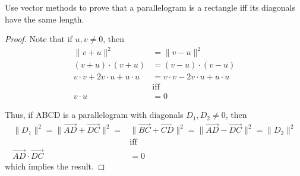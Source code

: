 \begin{exercise} \label{e1.2.10}
    Use vector methods to prove that a parallelogram is a rectangle iff its diagonals have the same length.
    
    \begin{proof}
        Note that if \( u, v \neq 0 \), then 
        \begin{align*}
            \lVert v+u \rVert^2 &= \lVert v-u \rVert^2 \\
            (v+u) \cdot (v+u) &= (v-u) \cdot (v-u) \\
            v \cdot v + 2 v\cdot u + u \cdot u &= v \cdot v - 2 v \cdot u + u \cdot u \\
            &\text{iff} \\
            v \cdot u &= 0
        \end{align*}
        
        \begin{center}
        \end{center}
        
        Thus, if ABCD is a parallelogram with diagonals \( D_1, D_2 \neq 0 \), then
        \begin{align*} \lVert D_1 \rVert^2 = \lVert \overrightarrow{AD} + \overrightarrow{DC} \rVert^2 = &\lVert \overrightarrow{BC} + \overrightarrow{CD} \rVert^2 = \lVert \overrightarrow{AD} - \overrightarrow{DC} \rVert^2 = \lVert D_2 \rVert^2 \\
        &\text{iff} \\
        \overrightarrow{AD} \cdot \overrightarrow{DC} &= 0
        \end{align*}
        which implies the result.
    \end{proof}
\end{exercise} %

